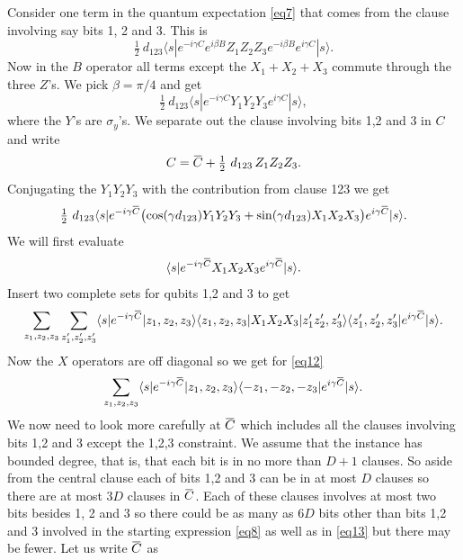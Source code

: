 \documentclass[t11pt,preprint,preprintnumbers]{revtex4}
\newcommand{\overbar}[1]{\mkern 1.5mu\overline{\mkern-1.5mu#1\mkern-1.5mu}\mkern 1.5mu}
\begin{document}
Consider one term in the quantum expectation \eqref{eq7} that comes from the clause involving say bits 1, 2 and 3.  This is
\begin{equation}\label{eq8}
\tfrac{1}{2}\ d_{123}  \langle s | e^{- i \gamma C} e^{i \beta B} Z_1 Z_2 Z_3 e^{-i \beta B}e^{i \gamma C} | s \rangle .
\end{equation}
\noindent Now in the $B$ operator all terms except the $X_1 + X_2 + X_3$ commute through the three $Z$'s.  We pick $\beta=\pi/4$ and get 
\begin{equation}\label{eq9}
\tfrac{1}{2}\ d_{123} \langle s | e^{- i \gamma C} Y_1 Y_2 Y_3 e^{i \gamma C} | s \rangle,
\end{equation}
\noindent where the $Y$'s are $\sigma_y$'s.  We separate out the clause involving bits 1,2 and 3 in $C$ and write 
\begin{equation}\label{eq10}
C = \overbar{C} + \tfrac{1}{2}\ d_{123}\, Z_1 Z_2 Z_3 .
\end{equation}
\noindent Conjugating the $Y_1 Y_2 Y_3$ with the contribution from clause 123 we get
\begin{equation}\label{eq11}
\tfrac{1}{2}\ d_{123} \langle s | e^{-i \gamma \overbar{C}} \bigl( \cos(\gamma d_{123})Y_1 Y_2 Y_3 + \sin(\gamma d_{123})X_1 X_2 X_3 \bigr) e^{i \gamma \overbar{C} }| s \rangle .
\end{equation}
\noindent We will first evaluate %
\begin{equation}\label{eq12}
\langle s | e^{-i \gamma \overbar{C}} X_1 X_2 X_3 e^{i \gamma \overbar{C}} | s \rangle .
\end{equation}
\noindent Insert two complete sets for qubits 1,2 and 3 to get
\begin{equation}
\sum_{z_1,z_2,z_3} \sum_{z_1',z_2',z_3'} \langle s | e^{- i \gamma \overbar{C}} |z_1,z_2,z_3\rangle\langle z_1,z_2,z_3| X_1 X_2 X_3|z_1'z_2',z_3'\rangle \langle z_1',z_2',z_3'|e^{i \gamma \overbar{C}} | s \rangle.
\end{equation}
\noindent Now the $X$ operators are off diagonal so we get for \eqref{eq12}
\begin{equation}\label{eq13}
\sum_{z_1,z_2,z_3} \langle s | e^{-i \gamma \overbar{C}} |z_1,z_2,z_3\rangle \langle -z_1,-z_2,-z_3 | e^{i \gamma \overbar{C}}| s \rangle .
\end{equation}
\indent We now need to look more carefully at $\overbar{C}$ which includes all the clauses involving bits 1,2 and 3 except the 1,2,3 constraint. We assume that the instance has bounded degree, that is, that each bit is in no more than $D+1$ clauses.  So aside from the central clause each of bits 1,2 and 3 can be in at most $D$ clauses so there are at most $3D$ clauses in $\overbar{C}$.  Each of these clauses involves at most two bits besides 1, 2 and 3 so there could be as many as $6D$ bits other than bits 1,2 and 3 involved in the starting expression \eqref{eq8} as well as in \eqref{eq13} but there may be fewer.  Let us write $\overbar{C}$ as
\end{document}
